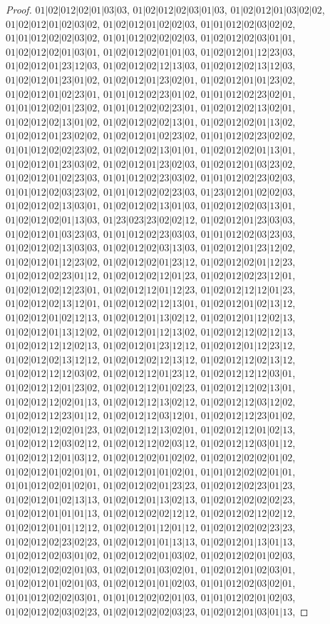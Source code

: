\documentclass[12pt]{article}
\theoremstyle{plain}
\theoremstyle{definition}
\theoremstyle{remark}
\begin{document}
\begin{proof}
$01|02|012|02|01|03|03$, $01|02|012|02|03|01|03$, $01|02|012|01|03|02|02$, $01|02|012|01|02|03|02$, $01|02|012|01|02|02|03$, $01|01|012|02|03|02|02$, $01|01|012|02|02|03|02$, $01|01|012|02|02|02|03$, $01|02|012|02|03|01|01$, $01|02|012|02|01|03|01$, $01|02|012|02|01|01|03$, $01|02|012|01|12|23|03$, $01|02|012|01|23|12|03$, $01|02|012|02|12|13|03$, $01|02|012|02|13|12|03$, $01|02|012|01|23|01|02$, $01|02|012|01|23|02|01$, $01|02|012|01|01|23|02$, $01|02|012|01|02|23|01$, $01|01|012|02|23|01|02$, $01|01|012|02|23|02|01$, $01|01|012|02|01|23|02$, $01|01|012|02|02|23|01$, $01|02|012|02|13|02|01$, $01|02|012|02|13|01|02$, $01|02|012|02|02|13|01$, $01|02|012|02|01|13|02$, $01|02|012|01|23|02|02$, $01|02|012|01|02|23|02$, $01|01|012|02|23|02|02$, $01|01|012|02|02|23|02$, $01|02|012|02|13|01|01$, $01|02|012|02|01|13|01$, $01|02|012|01|23|03|02$, $01|02|012|01|23|02|03$, $01|02|012|01|03|23|02$, $01|02|012|01|02|23|03$, $01|01|012|02|23|03|02$, $01|01|012|02|23|02|03$, $01|01|012|02|03|23|02$, $01|01|012|02|02|23|03$, $01|23|012|01|02|02|03$, $01|02|012|02|13|03|01$, $01|02|012|02|13|01|03$, $01|02|012|02|03|13|01$, $01|02|012|02|01|13|03$, $01|23|023|23|02|02|12$, $01|02|012|01|23|03|03$, $01|02|012|01|03|23|03$, $01|01|012|02|23|03|03$, $01|01|012|02|03|23|03$, $01|02|012|02|13|03|03$, $01|02|012|02|03|13|03$, $01|02|012|01|23|12|02$, $01|02|012|01|12|23|02$, $01|02|012|02|01|23|12$, $01|02|012|02|01|12|23$, $01|02|012|02|23|01|12$, $01|02|012|02|12|01|23$, $01|02|012|02|23|12|01$, $01|02|012|02|12|23|01$, $01|02|012|12|01|12|23$, $01|02|012|12|12|01|23$, $01|02|012|02|13|12|01$, $01|02|012|02|12|13|01$, $01|02|012|01|02|13|12$, $01|02|012|01|02|12|13$, $01|02|012|01|13|02|12$, $01|02|012|01|12|02|13$, $01|02|012|01|13|12|02$, $01|02|012|01|12|13|02$, $01|02|012|12|02|12|13$, $01|02|012|12|12|02|13$, $01|02|012|01|23|12|12$, $01|02|012|01|12|23|12$, $01|02|012|02|13|12|12$, $01|02|012|02|12|13|12$, $01|02|012|12|02|13|12$, $01|02|012|12|12|03|02$, $01|02|012|12|01|23|12$, $01|02|012|12|12|03|01$, $01|02|012|12|01|23|02$, $01|02|012|12|01|02|23$, $01|02|012|12|02|13|01$, $01|02|012|12|02|01|13$, $01|02|012|12|13|02|12$, $01|02|012|12|03|12|02$, $01|02|012|12|23|01|12$, $01|02|012|12|03|12|01$, $01|02|012|12|23|01|02$, $01|02|012|12|02|01|23$, $01|02|012|12|13|02|01$, $01|02|012|12|01|02|13$, $01|02|012|12|03|02|12$, $01|02|012|12|02|03|12$, $01|02|012|12|03|01|12$, $01|02|012|12|01|03|12$, $01|02|012|02|01|02|02$, $01|02|012|02|02|01|02$, $01|02|012|01|02|01|01$, $01|02|012|01|01|02|01$, $01|01|012|02|02|01|01$, $01|01|012|02|01|02|01$, $01|02|012|02|01|23|23$, $01|02|012|02|23|01|23$, $01|02|012|01|02|13|13$, $01|02|012|01|13|02|13$, $01|02|012|02|02|02|23$, $01|02|012|01|01|01|13$, $01|02|012|02|02|12|12$, $01|02|012|02|12|02|12$, $01|02|012|01|01|12|12$, $01|02|012|01|12|01|12$, $01|02|012|02|02|23|23$, $01|02|012|02|23|02|23$, $01|02|012|01|01|13|13$, $01|02|012|01|13|01|13$, $01|02|012|02|03|01|02$, $01|02|012|02|01|03|02$, $01|02|012|02|01|02|03$, $01|02|012|02|02|01|03$, $01|02|012|01|03|02|01$, $01|02|012|01|02|03|01$, $01|02|012|01|02|01|03$, $01|02|012|01|01|02|03$, $01|01|012|02|03|02|01$, $01|01|012|02|02|03|01$, $01|01|012|02|02|01|03$, $01|01|012|02|01|02|03$, $01|02|012|02|03|02|23$, $01|02|012|02|02|03|23$, $01|02|012|01|03|01|13$, 
\end{proof}
\end{document}
